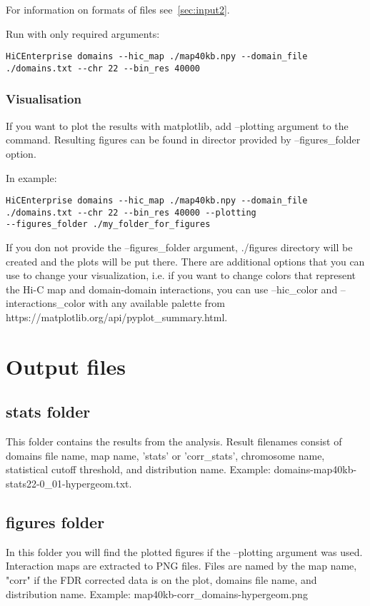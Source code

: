 For information on formats of files see~\ref{sec:input2}.

Run with only required arguments:
\begin{lstlisting}
HiCEnterprise domains --hic_map ./map40kb.npy --domain_file
./domains.txt --chr 22 --bin_res 40000
\end{lstlisting}


\subsubsection{Visualisation} %

If you want to plot the results with matplotlib, add --plotting argument to the command. Resulting figures can be found
in director provided by --figures\_folder option.

In example:
\begin{lstlisting}
HiCEnterprise domains --hic_map ./map40kb.npy --domain_file
./domains.txt --chr 22 --bin_res 40000 --plotting
--figures_folder ./my_folder_for_figures
\end{lstlisting}


If you don not provide the --figures\_folder argument, ./figures directory will be created and the plots will be put
there. There are additional options that you can use to change your visualization, i.e. if you want to change colors that
represent the Hi-C map and domain-domain interactions, you can use --hic\_color and --interactions\_color with any
available palette from https://matplotlib.org/api/pyplot\_summary.html.

\section{Output files}

\subsection{stats folder}
This folder contains the results from the analysis. Result filenames consist of domains file name, map name,
'stats' or 'corr\_stats', chromosome name, statistical cutoff threshold, and distribution name. Example:
domains-map40kb-stats22-0\_01-hypergeom.txt.

\subsection{figures folder}
In this folder you will find the plotted figures if the --plotting argument was used. Interaction maps are
extracted to PNG files. Files are named by the map name, "corr" if the FDR corrected data is on the plot, domains file
name, and distribution name. Example: map40kb-corr\_domains-hypergeom.png

